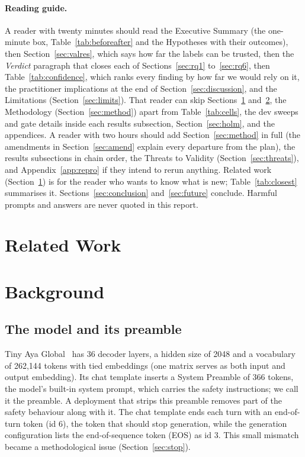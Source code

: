 \documentclass[runningheads]{llncs}
\begin{document}
\paragraph{Reading guide.} A reader with twenty minutes should read the Executive Summary (the one-minute box, Table~\ref{tab:beforeafter} and the Hypotheses with their outcomes), then Section~\ref{sec:valres}, which says how far the labels can be trusted, then the \emph{Verdict} paragraph that closes each of Sections~\ref{sec:rq1} to~\ref{sec:rq6}, then Table~\ref{tab:confidence}, which ranks every finding by how far we would rely on it, the practitioner implications at the end of Section~\ref{sec:discussion}, and the Limitations (Section~\ref{sec:limits}). That reader can skip Sections~\ref{sec:related} and~\ref{sec:background}, the Methodology (Section~\ref{sec:method}) apart from Table~\ref{tab:cells}, the dev sweeps and gate details inside each results subsection, Section~\ref{sec:holm}, and the appendices. A reader with two hours should add Section~\ref{sec:method} in full (the amendments in Section~\ref{sec:amend} explain every departure from the plan), the results subsections in chain order, the Threats to Validity (Section~\ref{sec:threats}), and Appendix~\ref{app:repro} if they intend to rerun anything. Related work (Section~\ref{sec:related}) is for the reader who wants to know what is new; Table~\ref{tab:closest} summarises it. Sections~\ref{sec:conclusion} and~\ref{sec:future} conclude. Harmful prompts and answers are never quoted in this report.

\section{Related Work}\label{sec:related}


\section{Background}\label{sec:background}

\subsection{The model and its preamble}
Tiny Aya Global~\cite{tinyaya} has 36 decoder layers, a hidden size of 2048 and a vocabulary of 262,144 tokens with tied embeddings (one matrix serves as both input and output embedding). Its chat template inserts a System Preamble of 366 tokens, the model's built-in system prompt, which carries the safety instructions; we call it the preamble. A deployment that strips this preamble removes part of the safety behaviour along with it. The chat template ends each turn with an end-of-turn token (id 6), the token that should stop generation, while the generation configuration lists the end-of-sequence token (EOS) as id 3. This small mismatch became a methodological issue (Section~\ref{sec:stop}).
\end{document}
